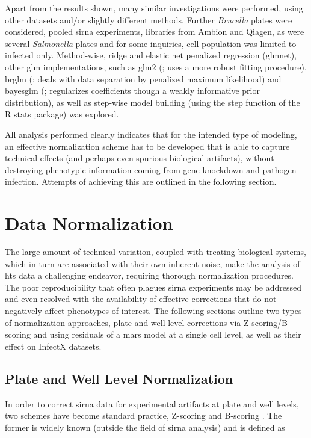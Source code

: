 Apart from the results shown, many similar investigations were performed, using other datasets and\slash or slightly different methods. Further \textit{Brucella} plates were considered, pooled \gls{sirna} experiments, libraries from Ambion and Qiagen, as were several \textit{Salmonella} plates and for some inquiries, cell population was limited to infected only. Method-wise, ridge and elastic net penalized regression (glmnet), other glm implementations, such as glm2 (\cite{Marschner2014}; uses a more robust fitting procedure), brglm (\cite{Kosmidis2013}; deals with data separation by penalized maximum likelihood) and bayesglm (\cite{Gelman2015}; regularizes coefficients though a weakly informative prior distribution), as well as step-wise model building (using the step function of the R stats package) was explored.


All analysis performed clearly indicates that for the intended type of modeling, an effective normalization scheme has to be developed that is able to capture technical effects (and perhaps even spurious biological artifacts), without destroying phenotypic information coming from gene knockdown and pathogen infection. Attempts of achieving this are outlined in the following section.

\section{Data Normalization}
\label{sec:data-normalization}
The large amount of technical variation, coupled with treating biological systems, which in turn are associated with their own inherent noise, make the analysis of \gls{hts} data a challenging endeavor, requiring thorough normalization procedures. The poor reproducibility that often plagues \gls{sirna} experiments may be addressed and even resolved with the availability of effective corrections that do not negatively affect phenotypes of interest. The following sections outline two types of normalization approaches, plate and well level corrections via Z-scoring\slash B-scoring and using residuals of a \gls{mars} model at a single cell level, as well as their effect on InfectX datasets.

\subsection{Plate and Well Level Normalization}
In order to correct \gls{sirna} data for experimental artifacts at plate and well levels, two schemes have become standard practice, Z-scoring and B-scoring \citep{Malo2006}. The former is widely known (outside the field of \gls{sirna} analysis) and is defined as


